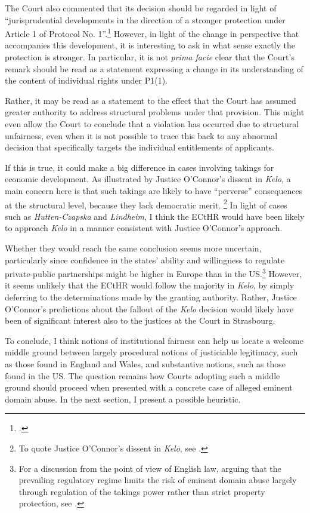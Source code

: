 The Court also commented that its decision should be regarded in light of ``jurisprudential developments in the direction of a stronger protection under Article 1 of Protocol No. 1''.\footcite[135]{lindheim12} However, in light of the change in perspective that accompanies this development, it is interesting to ask in what sense exactly the protection is stronger. In particular, it is not {\it prima facie} clear that the Court's remark should be read as a statement expressing a change in its understanding of the content of individual rights under P1(1). 

Rather, it may be read as a statement to the effect that the Court has assumed greater authority to address structural problems under that provision. This might even allow the Court to conclude that a violation has occurred due to structural unfairness, even when it is not possible to trace this back to any abnormal decision that specifically targets the individual entitlements of applicants.

If this is true, it could make a big difference in cases involving takings for economic development. As illustrated by Justice O'Connor's dissent in {\it Kelo}, a main concern here is that such takings are likely to have ``perverse'' consequences at the structural level, because they lack democratic merit. \footnote{To quote Justice O'Connor's dissent in {\it Kelo}, see \cite{kelo05}.} In light of cases such as {\it Hutten-Czapska} and {\it Lindheim}, I think the ECtHR would have been likely to approach {\it Kelo} in a manner consistent with Justice O'Connor's approach.

Whether they would reach the same conclusion seems more uncertain, particularly since confidence in the states' ability and willingness to regulate private-public partnerships might be higher in Europe than in the US.\footnote{For a discussion from the point of view of English law, arguing that the prevailing regulatory regime limits the risk of eminent domain abuse largely through regulation of the takings power rather than strict property protection, see \cite{allen08}.} However, it seems unlikely that the ECtHR would follow the majority in {\it Kelo}, by simply deferring to the determinations made by the granting authority. Rather, Justice O'Connor's predictions about the fallout of the {\it Kelo} decision would likely have been of significant interest also to the justices at the Court in Strasbourg.

To conclude, I think notions of institutional fairness can help us locate a welcome middle ground between largely procedural notions of justiciable legitimacy, such as those found in England and Wales, and substantive notions, such as those found in the US. The question remains how Courts adopting such a middle ground should proceed when presented with a concrete case of alleged eminent domain abuse. In the next section, I present a possible heuristic.

